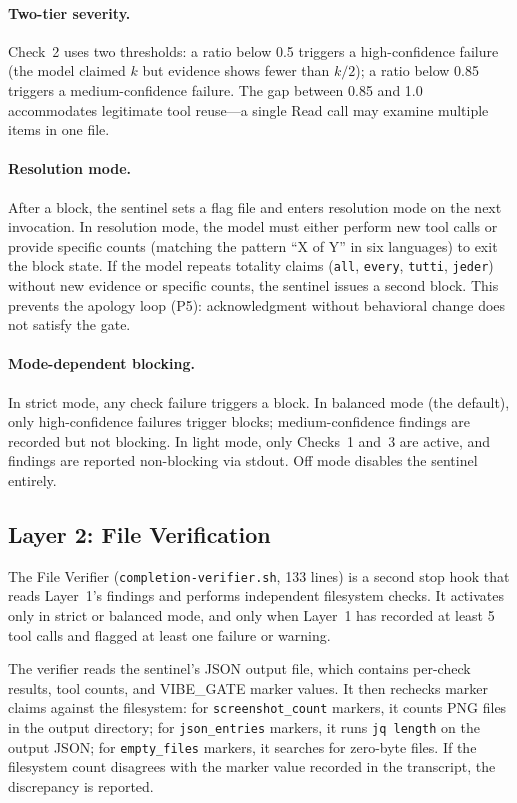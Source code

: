\paragraph{Two-tier severity.}
Check~2 uses two thresholds: a ratio below 0.5 triggers a high-confidence failure (the model claimed $k$ but evidence shows fewer than $k/2$); a ratio below 0.85 triggers a medium-confidence failure.
The gap between 0.85 and 1.0 accommodates legitimate tool reuse---a single Read call may examine multiple items in one file.

\paragraph{Resolution mode.}
After a block, the sentinel sets a flag file and enters resolution mode on the next invocation.
In resolution mode, the model must either perform new tool calls or provide specific counts (matching the pattern ``X of Y'' in six languages) to exit the block state.
If the model repeats totality claims (\texttt{all}, \texttt{every}, \texttt{tutti}, \texttt{jeder}) without new evidence or specific counts, the sentinel issues a second block.
This prevents the apology loop (P5): acknowledgment without behavioral change does not satisfy the gate.

\paragraph{Mode-dependent blocking.}
In strict mode, any check failure triggers a block.
In balanced mode (the default), only high-confidence failures trigger blocks; medium-confidence findings are recorded but not blocking.
In light mode, only Checks~1 and~3 are active, and findings are reported non-blocking via stdout.
Off mode disables the sentinel entirely.


\subsection{Layer 2: File Verification}
\label{sec:verifier}

The File Verifier (\texttt{completion-verifier.sh}, 133 lines) is a second stop hook that reads Layer~1's findings and performs independent filesystem checks.
It activates only in strict or balanced mode, and only when Layer~1 has recorded at least 5 tool calls and flagged at least one failure or warning.

The verifier reads the sentinel's JSON output file, which contains per-check results, tool counts, and VIBE\_GATE marker values.
It then rechecks marker claims against the filesystem: for \texttt{screenshot\_count} markers, it counts PNG files in the output directory; for \texttt{json\_entries} markers, it runs \texttt{jq length} on the output JSON; for \texttt{empty\_files} markers, it searches for zero-byte files.
If the filesystem count disagrees with the marker value recorded in the transcript, the discrepancy is reported.

